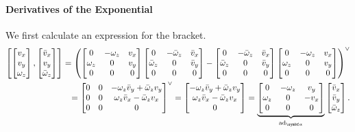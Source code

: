 \paragraph{Derivatives of the Exponential}

We first calculate an expression for the bracket.
\begin{equation}
  \begin{aligned}
    \left[ \begin{bmatrix} v_x \\ v_y \\ \omega_z \end{bmatrix}, \begin{bmatrix} \bar v_x \\ v_y \\ \bar \omega_z \end{bmatrix} \right] = \left( \begin{bmatrix}
      0 & -\omega_z & v_x \\ \omega_z & 0 & v_y \\ 0 & 0 & 0
    \end{bmatrix}\begin{bmatrix}
      0 & -\bar\omega_z & \bar v_x \\ \bar\omega_z & 0 & \bar v_y \\ 0 & 0 & 0
    \end{bmatrix} - \begin{bmatrix}
      0 & -\bar\omega_z & \bar v_x \\ \bar\omega_z & 0 & \bar v_y \\ 0 & 0 & 0
    \end{bmatrix}\begin{bmatrix}
      0 & -\omega_z & v_x \\ \omega_z & 0 & v_y \\ 0 & 0 & 0
    \end{bmatrix} \right)^{\vee} \\
    = \begin{bmatrix} 0 & 0 & -\omega_z \bar v_y + \bar \omega_z v_y \\
                0 & 0 & \omega_z \bar v_x - \bar \omega_z v_x  \\
                0 & 0 & 0
    \end{bmatrix}^\vee
    = \begin{bmatrix}  -\omega_z \bar v_y + \bar \omega_z v_y \\ \omega_z \bar v_x - \bar \omega_z v_x \\ 0 \end{bmatrix} = \underbrace{\begin{bmatrix}  0 & -\omega_z & v_y \\ \omega_z & 0 & -v_x \\ 0 & 0 & 0 \end{bmatrix}}_{\ad_\a} \begin{bmatrix} \bar v_x \\  \bar v_y  \\ \bar \omega_z \end{bmatrix}.
  \end{aligned}
\end{equation}

